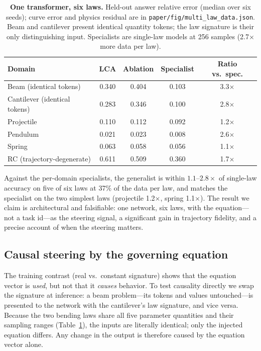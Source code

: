 \documentclass[11pt,a4paper]{article}
\begin{document}
\begin{table}[t]
\centering
\small
\caption{\textbf{One transformer, six laws.} Held-out answer relative error
(median over six seeds); curve error and physics residual are in
\texttt{paper/fig/multi\_law\_data.json}. Beam and cantilever present
identical quantity tokens; the law signature is their only distinguishing
input. Specialists are single-law models at 256 samples (2.7$\times$ more
data per law).}
\label{tab:lca}
\begin{tabular}{@{}lcccc@{}}
\toprule
Domain & LCA & Ablation & Specialist & Ratio vs.\ spec. \\
\midrule
Beam (identical tokens) & 0.340 & 0.404 & 0.103 & 3.3$\times$ \\
Cantilever (identical tokens) & 0.283 & 0.346 & 0.100 & 2.8$\times$ \\
Projectile & 0.110 & 0.112 & 0.092 & 1.2$\times$ \\
Pendulum & 0.021 & 0.023 & 0.008 & 2.6$\times$ \\
Spring & 0.063 & 0.058 & 0.056 & 1.1$\times$ \\
RC (trajectory-degenerate) & 0.611 & 0.509 & 0.360 & 1.7$\times$ \\
\bottomrule
\end{tabular}
\end{table}

Against the per-domain specialists, the generalist is within $1.1$--$2.8\times$
of single-law accuracy on five of six laws at 37\% of the data per law,
and matches the specialist on the two simplest laws (projectile 1.2$\times$,
spring 1.1$\times$). The result we claim is architectural and falsifiable:
one network, six laws, with the equation---not a task id---as the steering
signal, a significant gain in trajectory fidelity, and a precise account
of when the steering matters.

\subsection{Causal steering by the governing equation}\label{sec:steering}

The training contrast (real vs.\ constant signature) shows that the equation
vector is \emph{used}, but not that it \emph{causes} behavior. To test
causality directly we swap the signature at inference: a beam problem---its
tokens and values untouched---is presented to the network with the
cantilever's law signature, and vice versa. Because the two bending laws
share all five parameter quantities and their sampling ranges
(Table~\ref{tab:lca}), the inputs are literally identical; only the injected
equation differs. Any change in the output is therefore caused by the
equation vector alone.
\end{document}
